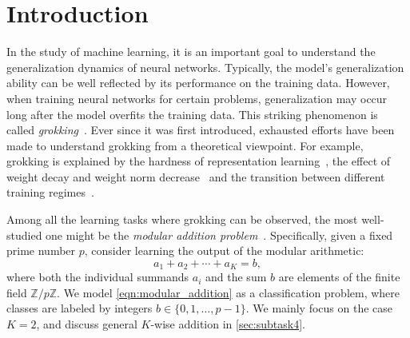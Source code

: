 \section{Introduction}
\label{sec:intro}

In the study of machine learning, it is an important goal to understand the generalization dynamics of neural networks.
Typically, the model's generalization ability can be well reflected by its performance on the training data.
However, when training neural networks for certain problems, generalization may occur long after the model overfits the training data. 
This striking phenomenon is called \emph{grokking}~\cite{Grokking}. 
Ever since it was first introduced, exhausted efforts have been made to understand grokking from a theoretical viewpoint.
For example, grokking is explained by the hardness of representation learning~\cite{LiuKNMTW22},
the effect of weight decay and weight norm decrease~\cite{Grokking_circuit_efficiency,LiuMT23}
and the transition between different training regimes~\cite{KumarBGP24,MohamadiLWS24}.

Among all the learning tasks where grokking can be observed, the most well-studied one might be the \emph{modular addition problem}~\cite{Grokking,KumarBGP24,MohamadiLWS24,Gromov}.
Specifically, given a fixed prime number $p$, consider learning the output of the modular arithmetic: %
\begin{equation}
    a_{1} + a_{2} + \cdots + a_{K} = b,
    \label{eqn:modular_addition}
\end{equation}
where both the individual summands $a_i$ and the sum $b$ are elements of the finite field $\mathbb{Z}/p\mathbb{Z}$.
We model \eqref{eqn:modular_addition} as a classification problem, where classes are labeled by integers $b \in \{0, 1, \dots, p-1\}$.
We mainly focus on the case $K=2$, and discuss general $K$-wise addition in \cref{sec:subtask4}.


